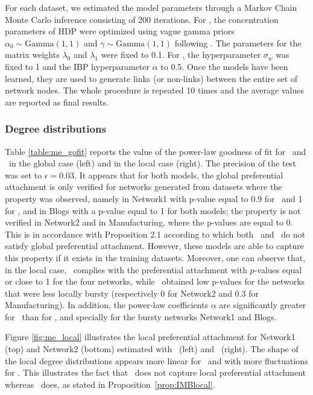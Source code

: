 For each dataset, we estimated the model parameters through a Markov Chain Monte Carlo inference consisting of 200 iterations. For \imb, the concentration parameters of HDP were optimized using vague gamma priors $\alpha_0 \sim \text{Gamma}(1,1)$ and $\gamma \sim \text{Gamma}(1,1)$ following \cite{HDP}. The parameters for the matrix weights  $\lambda_0$ and $\lambda_1$ were fixed to 0.1. For \ifm, the hyperparameter  $\sigma_w$ was fixed to 1 and the IBP hyperparameter $\alpha$ to 0.5. %
Once the models have been learned, they are used to generate links (or non-links) between the entire set of network nodes. The whole procedure is repeated 10 times and the average values are reported as final results.



\subsubsection{Degree distributions}

Table \ref{table:me_gofit} reports the value of the power-law goodness of fit for \imb\ and \ifm\ in the global case (left) and in the local case (right). The precision of the test was set to $\epsilon = 0.03$. It appears that for both models, the global preferential attachment is only verified for networks generated from datasets where the property was observed, namely in Network1 with p-value equal to 0.9 for \imb\ and 1 for \ifm, and in Blogs with a p-value equal to 1 for both models; the property is not verified in Network2 and in Manufacturing, where the p-values are equal to 0. This is in accordance with Proposition 2.1 according to which both \ifm\ and \imb\ do not satisfy global preferential attachment. However, these models are able to capture this property if it exists in the training datasets.  Moreover, one can observe that, in the local case, \imb\ complies with the preferential attachment with $p$-values equal or close to 1 for the four networks, while \ifm\ obtained low p-values for the networks that were less locally bursty (respectively  0  for Network2 and 0.3 for Manufacturing). In addition, the power-law coefficients $\alpha$ are significantly greater for \imb\ than for \ifm, and specially for the bursty networks Network1 and Blogs.

Figure \ref{fig:me_local} illustrates the local preferential attachment for Network1 (top) and Network2 (bottom) estimated with \imb\ (left) and \ifm\ (right). The shape of the local degree distributions appears more linear for \imb\ and with more fluctuations for \ifm. This illustrates the fact that \ifm\ does not capture local preferential attachment whereas \imb\ does, as stated in Proposition~\ref{prop:IMBlocal}. 

